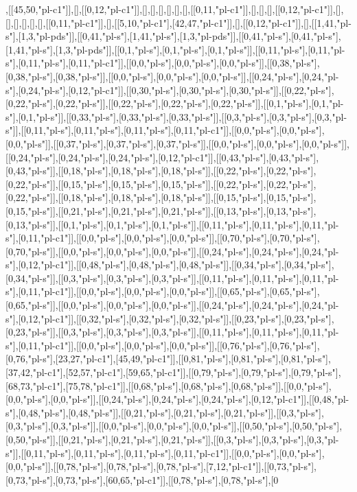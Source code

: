 ,[[45,50,"pl-c1"]],[],[[0,12,"pl-c1"]],[],[],[],[],[],[],[[0,11,"pl-c1"]],[],[],[],[[0,12,"pl-c1"]],[],[],[],[],[],[],[[0,11,"pl-c1"]],[],[[5,10,"pl-c1"],[42,47,"pl-c1"]],[],[[0,12,"pl-c1"]],[],[[1,41,"pl-s"],[1,3,"pl-pds"]],[[0,41,"pl-s"],[1,41,"pl-s"],[1,3,"pl-pds"]],[[0,41,"pl-s"],[0,41,"pl-s"],[1,41,"pl-s"],[1,3,"pl-pds"]],[[0,1,"pl-s"],[0,1,"pl-s"],[0,1,"pl-s"]],[[0,11,"pl-s"],[0,11,"pl-s"],[0,11,"pl-s"],[0,11,"pl-c1"]],[[0,0,"pl-s"],[0,0,"pl-s"],[0,0,"pl-s"]],[[0,38,"pl-s"],[0,38,"pl-s"],[0,38,"pl-s"]],[[0,0,"pl-s"],[0,0,"pl-s"],[0,0,"pl-s"]],[[0,24,"pl-s"],[0,24,"pl-s"],[0,24,"pl-s"],[0,12,"pl-c1"]],[[0,30,"pl-s"],[0,30,"pl-s"],[0,30,"pl-s"]],[[0,22,"pl-s"],[0,22,"pl-s"],[0,22,"pl-s"]],[[0,22,"pl-s"],[0,22,"pl-s"],[0,22,"pl-s"]],[[0,1,"pl-s"],[0,1,"pl-s"],[0,1,"pl-s"]],[[0,33,"pl-s"],[0,33,"pl-s"],[0,33,"pl-s"]],[[0,3,"pl-s"],[0,3,"pl-s"],[0,3,"pl-s"]],[[0,11,"pl-s"],[0,11,"pl-s"],[0,11,"pl-s"],[0,11,"pl-c1"]],[[0,0,"pl-s"],[0,0,"pl-s"],[0,0,"pl-s"]],[[0,37,"pl-s"],[0,37,"pl-s"],[0,37,"pl-s"]],[[0,0,"pl-s"],[0,0,"pl-s"],[0,0,"pl-s"]],[[0,24,"pl-s"],[0,24,"pl-s"],[0,24,"pl-s"],[0,12,"pl-c1"]],[[0,43,"pl-s"],[0,43,"pl-s"],[0,43,"pl-s"]],[[0,18,"pl-s"],[0,18,"pl-s"],[0,18,"pl-s"]],[[0,22,"pl-s"],[0,22,"pl-s"],[0,22,"pl-s"]],[[0,15,"pl-s"],[0,15,"pl-s"],[0,15,"pl-s"]],[[0,22,"pl-s"],[0,22,"pl-s"],[0,22,"pl-s"]],[[0,18,"pl-s"],[0,18,"pl-s"],[0,18,"pl-s"]],[[0,15,"pl-s"],[0,15,"pl-s"],[0,15,"pl-s"]],[[0,21,"pl-s"],[0,21,"pl-s"],[0,21,"pl-s"]],[[0,13,"pl-s"],[0,13,"pl-s"],[0,13,"pl-s"]],[[0,1,"pl-s"],[0,1,"pl-s"],[0,1,"pl-s"]],[[0,11,"pl-s"],[0,11,"pl-s"],[0,11,"pl-s"],[0,11,"pl-c1"]],[[0,0,"pl-s"],[0,0,"pl-s"],[0,0,"pl-s"]],[[0,70,"pl-s"],[0,70,"pl-s"],[0,70,"pl-s"]],[[0,0,"pl-s"],[0,0,"pl-s"],[0,0,"pl-s"]],[[0,24,"pl-s"],[0,24,"pl-s"],[0,24,"pl-s"],[0,12,"pl-c1"]],[[0,48,"pl-s"],[0,48,"pl-s"],[0,48,"pl-s"]],[[0,34,"pl-s"],[0,34,"pl-s"],[0,34,"pl-s"]],[[0,3,"pl-s"],[0,3,"pl-s"],[0,3,"pl-s"]],[[0,11,"pl-s"],[0,11,"pl-s"],[0,11,"pl-s"],[0,11,"pl-c1"]],[[0,0,"pl-s"],[0,0,"pl-s"],[0,0,"pl-s"]],[[0,65,"pl-s"],[0,65,"pl-s"],[0,65,"pl-s"]],[[0,0,"pl-s"],[0,0,"pl-s"],[0,0,"pl-s"]],[[0,24,"pl-s"],[0,24,"pl-s"],[0,24,"pl-s"],[0,12,"pl-c1"]],[[0,32,"pl-s"],[0,32,"pl-s"],[0,32,"pl-s"]],[[0,23,"pl-s"],[0,23,"pl-s"],[0,23,"pl-s"]],[[0,3,"pl-s"],[0,3,"pl-s"],[0,3,"pl-s"]],[[0,11,"pl-s"],[0,11,"pl-s"],[0,11,"pl-s"],[0,11,"pl-c1"]],[[0,0,"pl-s"],[0,0,"pl-s"],[0,0,"pl-s"]],[[0,76,"pl-s"],[0,76,"pl-s"],[0,76,"pl-s"],[23,27,"pl-c1"],[45,49,"pl-c1"]],[[0,81,"pl-s"],[0,81,"pl-s"],[0,81,"pl-s"],[37,42,"pl-c1"],[52,57,"pl-c1"],[59,65,"pl-c1"]],[[0,79,"pl-s"],[0,79,"pl-s"],[0,79,"pl-s"],[68,73,"pl-c1"],[75,78,"pl-c1"]],[[0,68,"pl-s"],[0,68,"pl-s"],[0,68,"pl-s"]],[[0,0,"pl-s"],[0,0,"pl-s"],[0,0,"pl-s"]],[[0,24,"pl-s"],[0,24,"pl-s"],[0,24,"pl-s"],[0,12,"pl-c1"]],[[0,48,"pl-s"],[0,48,"pl-s"],[0,48,"pl-s"]],[[0,21,"pl-s"],[0,21,"pl-s"],[0,21,"pl-s"]],[[0,3,"pl-s"],[0,3,"pl-s"],[0,3,"pl-s"]],[[0,0,"pl-s"],[0,0,"pl-s"],[0,0,"pl-s"]],[[0,50,"pl-s"],[0,50,"pl-s"],[0,50,"pl-s"]],[[0,21,"pl-s"],[0,21,"pl-s"],[0,21,"pl-s"]],[[0,3,"pl-s"],[0,3,"pl-s"],[0,3,"pl-s"]],[[0,11,"pl-s"],[0,11,"pl-s"],[0,11,"pl-s"],[0,11,"pl-c1"]],[[0,0,"pl-s"],[0,0,"pl-s"],[0,0,"pl-s"]],[[0,78,"pl-s"],[0,78,"pl-s"],[0,78,"pl-s"],[7,12,"pl-c1"]],[[0,73,"pl-s"],[0,73,"pl-s"],[0,73,"pl-s"],[60,65,"pl-c1"]],[[0,78,"pl-s"],[0,78,"pl-s"],[0